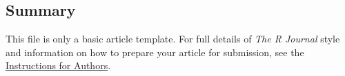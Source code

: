 \hypertarget{summary}{%
\subsection{Summary}\label{summary}}

This file is only a basic article template. For full details of
\emph{The R Journal} style and information on how to prepare your
article for submission, see the
\href{https://journal.r-project.org/share/author-guide.pdf}{Instructions
for Authors}.



\address{%
Author One\\
Affiliation\\%
line 1\\ line 2\\
%
\url{https://journal.r-project.org}%
\\\textit{ORCiD: \href{https://orcid.org/0000-0002-9079-593X}{0000-0002-9079-593X}}%
\\\href{mailto:author1@work}{\nolinkurl{author1@work}}
}

\address{%
Author Two\\
Affiliation 1\\%
line 1 affiliation 1\\ line 2 affiliation 1\\
Affiliation 2\\%
line 1 affiliation 2\\ line 2 affiliation 2\\
%
\url{https://journal.r-project.org}%
\\\textit{ORCiD: \href{https://orcid.org/0000-0002-9079-593X}{0000-0002-9079-593X}}%
\\\href{mailto:author2@work}{\nolinkurl{author2@work}}
}
